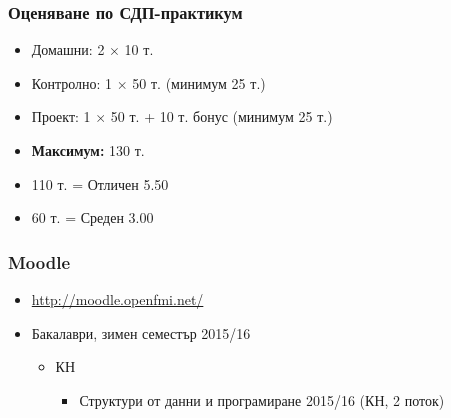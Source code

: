 \documentclass{beamer}
\begin{document}
\begin{frame}
  \frametitle{Оценяване по СДП-практикум}

  \begin{itemize}
  \item Домашни: 2 $\times$ 10 т.
  \item Контролно: 1 $\times$ 50 т. (минимум 25 т.)
  \item Проект: 1 $\times$ 50 т. + 10 т. бонус (минимум 25 т.)
  \item \textbf{Максимум:} 130 т.
  \item 110 т. = Отличен 5.50
  \item 60 т. = Среден 3.00
  \end{itemize}
\end{frame}

\begin{frame}
  \frametitle{Moodle}
  
  \begin{itemize}
  \item \url{http://moodle.openfmi.net/}
  \item Бакалаври, зимен семестър 2015/16
    \begin{itemize}
    \item КН
      \begin{itemize}
      \item Структури от данни и програмиране 2015/16 (КН, 2 поток)
      \end{itemize}
    \end{itemize}
  \end{itemize}
\end{frame}
\end{document}
